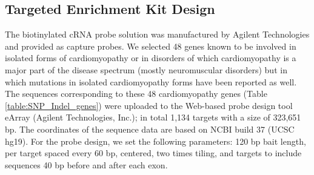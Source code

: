 \subsection{Targeted Enrichment Kit Design}
The biotinylated cRNA probe solution was manufactured by Agilent Technologies and provided as capture probes. 
We selected 48 genes known to be involved in isolated forms of cardiomyopathy or in disorders of which cardiomyopathy is a major part of the disease spectrum (mostly neuromuscular disorders) but in which mutations in isolated cardiomyopathy forms have been reported as well. 
The sequences corresponding to these 48 cardiomyopathy genes (Table \ref{table:SNP_Indel_genes}) were uploaded to the Web-based probe design tool eArray (Agilent Technologies, Inc.); in total 1,134 targets with a size of 323,651 bp. 
The coordinates of the sequence data are based on NCBI build 37 (UCSC hg19). 
For the probe design, we set the following parameters: 120 bp bait length, per target spaced every 60 bp, centered, two times tiling, and targets to include sequences 40 bp before and after each exon.


